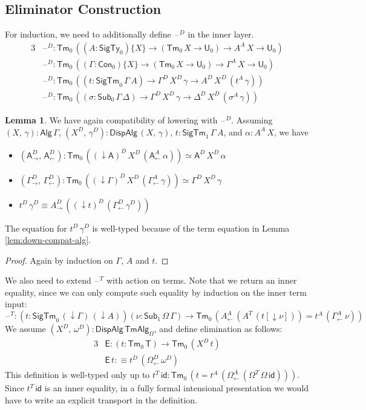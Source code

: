 \documentclass[12pt,a4paper,twoside,openany]{book}
\theoremstyle{remark}
\theoremstyle{definition}
\newtheorem{mylemma}{Lemma}
\theoremstyle{theorem}
\newcommand{\ms}[1]{\mathsf{#1}}
\newcommand{\id}{\mathsf{id}}
\newcommand{\Con}{\mathsf{Con}}
\newcommand{\Sub}{\mathsf{Sub}}
\newcommand{\Tm}{\mathsf{Tm}}
\newcommand{\U}{\mathsf{U}}
\newcommand{\blank}{\mathord{\hspace{1pt}\text{--}\hspace{1pt}}}
\newcommand{\SigTy}{\mathsf{SigTy}}
\newcommand{\SigTm}{\mathsf{SigTm}}
\newcommand{\A}{\mathsf{A}}
\newcommand{\Alg}{\ms{Alg}}
\newcommand{\DispAlg}{\ms{DispAlg}}
\newcommand{\TmAlg}{\ms{TmAlg}}
\newcommand{\down}{\downarrow}
\newcommand{\defn}{:\equiv}
\begin{document}
\subsection{Eliminator Construction}

For induction, we need to additionally define $\blank^D$ in the inner layer.
\begin{alignat*}{3}
  &\blank^D : \Tm_0\,((A : \SigTy_0)\{X\} \to (\Tm_0\,X \to \U_0) \to A^A\,X \to \U_0)\\
  &\blank^D : \Tm_0\,((\Gamma : \Con_0)\{X\} \to (\Tm_0\,X \to \U_0) \to \Gamma^A\,X \to \U_0)\\
  &\blank^D : \Tm_0\,((t : \SigTm_0\,\Gamma\,A) \to \Gamma^D\,X^D\,\gamma \to A^D\,X^D\,(t^A\,\gamma))\\
  &\blank^D : \Tm_0\,((\sigma : \Sub_0\,\Gamma\,\Delta) \to \Gamma^D\,X^D\,\gamma \to \Delta^D\,X^D\,(\sigma^A\,\gamma))
\end{alignat*}

\begin{mylemma}
We have again compatibility of lowering with $\blank^D$. Assuming
$(X,\,\gamma) : \Alg\,\Gamma$, $(X^D,\,\gamma^D) : \DispAlg\,(X,\,\gamma)$,
$t : \SigTm_1\,\Gamma\,A$, and $\alpha : A^A\,X$, we have
\begin{itemize}
  \item $(\A^D_{\to},\,\A^D_{\leftarrow}) :
    \Tm_0\,((\down\!\A)^D\,X^D\,(\A^A_{\leftarrow}\,\alpha)) \simeq \A^D\,X^D\,\alpha$
  \item $(\Gamma^D_{\to},\,\Gamma^D_{\leftarrow}) :
    \Tm_0\,((\down\!\Gamma)^D\,X^D\,(\Gamma^A_{\leftarrow}\,\gamma)) \simeq \Gamma^D\,X^D\,\gamma$
  \item $t^D\,\gamma^D \equiv A^D_{\to}\,((\down\!t)^D\,(\Gamma^D_{\leftarrow}\,\gamma^D))$
\end{itemize}
The equation for $t^D\,\gamma^D$ is well-typed because of the term equation in Lemma
\ref{lem:down-compat-alg}.
\end{mylemma}
\begin{proof} Again by induction on $\Gamma$, $A$ and $t$.
\end{proof}

We also need to extend $\blank^T$ with action on terms. Note that we return
an inner equality, since we can only compute such equality by induction on the
inner term input:
\[
\blank^T : (t : \SigTm_0\,(\down\!\Gamma)\,(\down\!A))(\nu : \Sub_1\,\Omega\,\Gamma) \to
  \Tm_0\,(A^A_{\leftarrow}\,(A^T\,(t[\down\!\nu])) = t^A\,(\Gamma^A_{\leftarrow}\,\nu))
\]
We assume $(X^D,\,\omega^D) : \DispAlg\,\TmAlg_\Omega$, and define elimination
as follows:
\begin{alignat*}{3}
  & \ms{E} : (t : \Tm_0\,\ms{T}) \to \Tm_0\,(X^D\,t) \\
  & \ms{E}\,t \defn t^D\,(\Omega^D_{\leftarrow}\,\omega^D)
\end{alignat*}
This definition is well-typed only up to $t^T\,\id : \Tm_0\,(t =
t^A\,(\Omega^A_{\leftarrow}\,(\Omega^T\,\Omega\,\id)))$. Since $t^T\,\id$ is an
inner equality, in a fully formal intensional presentation we would have to
write an explicit transport in the definition.
\end{document}

